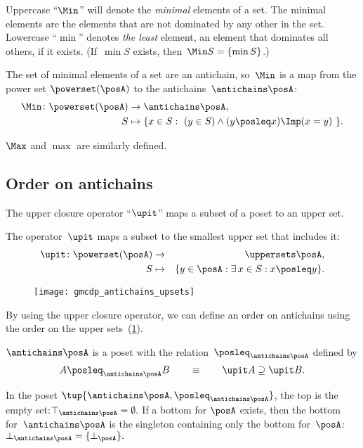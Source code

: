 
Uppercase ``$\Min$'' will denote the \emph{minimal} elements of a set.
The minimal elements are the elements that are not dominated by any other in the set.
Lowercase ``$\min$'' denotes\emph{ the least} element, an element that dominates all others, if it exists.
(If~$\min S$ exists, then~$\Min S=\{\min S\}$.)

The set of minimal elements of a set are an antichain, so~$\Min$
is a map from the power set $\powerset(\posA)$ to the antichains~$\antichains\posA$:
\begin{align*}
    \Min\colon\powerset(\posA) & \rightarrow\antichains\posA,                               \\
    S                          & \mapsto\{x\in S:\ (y\in S)\wedge(y\posleq x)\Imp(x=y)\ \}.
\end{align*}

$\Max$ and $\max$ are similarly defined.

\subsection{Order on antichains}

The upper closure operator ``$\upit$'' maps a subset of a poset to an upper set.
\begin{definition}
    The operator~$\upit$ maps a subset to the smallest upper set that includes it:
    \begin{eqnarray*}
        \upit\colon\powerset(\posA) & \rightarrow & \uppersets\posA,\\
        S & \mapsto & \{y\in\posA:\exists\,x\in S:x\posleq y\}.
    \end{eqnarray*}
\end{definition}

\begin{figure}[h]
    \centering
    \texttt{[image: gmcdp\_antichains\_upsets]}
    \caption{}
    \label{fig:antichains_upsets}
\end{figure}

By using the upper closure operator, we can define an order on antichains using the order on the upper sets~(\cref{fig:antichains_upsets}).
\begin{lemma}
    \label{lem:antichains-are-poset}$\antichains\posA$ is a poset with the relation~$\posleq_{\antichains\posA}$ defined by
    \[
        A\posleq_{\antichains\posA}B\qquad\equiv\qquad\upit A\supseteq\upit B.
    \]
\end{lemma}
In the poset $\tup{\antichains\posA,\posleq_{\antichains\posA}}$, the top is the empty set:$\top_{\antichains\posA}=\emptyset.$ If a bottom for $\posA$ exists, then the bottom for~$\antichains\posA$
is the singleton containing only the bottom for~$\posA$: $\bot_{\antichains\posA}=\{\bot_{\posA}\}.$

